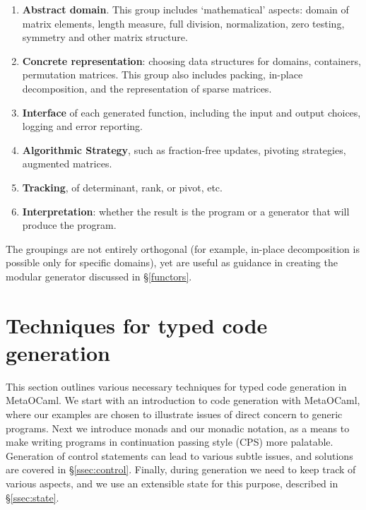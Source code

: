 \documentclass{elsart}
\newcommand{\oleg}[1]{{\it [Oleg says: #1]}}
\newcommand{\jacques}[1]{{\it [Jacques says: #1]}}
\begin{document}
\begin{enumerate}
    \item \textbf{Abstract domain}.  This group includes
      `mathematical' aspects: domain of matrix elements, length
      measure, full division, normalization, zero testing,
      symmetry and other matrix structure.
    \item \textbf{Concrete representation}: choosing data
      structures for domains, containers, permutation
      matrices. This group also includes packing, in-place
      decomposition, and the
      representation of sparse matrices.
    \item \textbf{Interface} of each generated function, including
      the input and output choices, logging and error reporting.
    \item \textbf{Algorithmic Strategy}, such as fraction-free
      updates, pivoting strategies, augmented matrices.
    \item \textbf{Tracking}, of determinant, rank, or pivot, etc.
    \item \textbf{Interpretation}: whether the result is the program or a
      generator that will produce the program.
\end{enumerate}


The groupings are not entirely orthogonal (for example, in-place
decomposition is possible only for specific domains), yet are useful
as guidance in creating the modular generator discussed in 
\S\ref{functors}.

\section{Techniques for typed code generation}\label{CPS}

This section  outlines various necessary techniques for typed code
generation in MetaOCaml.  We start with an introduction to code generation
with MetaOCaml, where our examples are chosen to illustrate issues of
direct concern to generic programs.  Next we introduce monads and our
monadic notation, as a means to make writing programs in continuation
passing style (CPS) more palatable.  Generation of control statements can
lead to various subtle issues, and solutions are covered in 
\S\ref{ssec:control}.  Finally, during generation we need to keep track of
various aspects, and we use an extensible state for this purpose, described
in \S\ref{ssec:state}.
\end{document}
